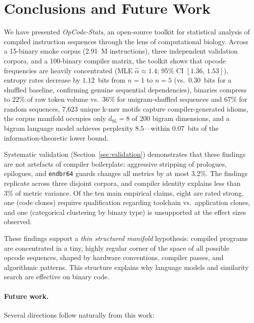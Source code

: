 \documentclass[10pt,twocolumn]{article}
\begin{document}
\section{Conclusions and Future Work}
\label{sec:conclusion}

We have presented \emph{OpCode-Stats}, an open-source toolkit for statistical
analysis of compiled instruction sequences through the lens of computational
biology.  Across a 15-binary smoke corpus (2.91~M instructions), three
independent validation corpora, and a 100-binary compiler matrix, the toolkit
shows that opcode frequencies are heavily concentrated (MLE
$\hat{\alpha} \approx 1.4$; 95\% CI $[1.36,\, 1.53]$), entropy rates
decrease by $1.12$~bits from $n\!=\!1$ to $n\!=\!5$ (vs.\ $0.30$~bits for a
shuffled baseline, confirming genuine sequential dependencies), binaries
compress to $22\%$ of raw token volume vs.\ $36\%$ for unigram-shuffled
sequences and $67\%$ for random sequences, 7,623 unique k-mer motifs capture
compiler-generated idioms, the corpus manifold occupies only $d_{95} = 8$ of
200 bigram dimensions, and a bigram language model achieves perplexity
$8.5$---within $0.07$~bits of the information-theoretic lower bound.

Systematic validation (Section~\ref{sec:validation}) demonstrates that these
findings are not artefacts of compiler boilerplate: aggressive stripping of
prologues, epilogues, and \texttt{endbr64} guards changes all metrics by at
most 3.2\%.  The findings replicate across three disjoint corpora, and
compiler identity explains less than 3\% of metric variance.  Of the ten
main empirical claims, eight are rated strong, one (code clones) requires
qualification regarding toolchain vs.\ application clones, and one
(categorical clustering by binary type) is unsupported at the effect sizes
observed.

These findings support a \emph{thin structured manifold} hypothesis:
compiled programs are concentrated in a tiny, highly regular corner of the
space of all possible opcode sequences, shaped by hardware conventions,
compiler passes, and algorithmic patterns.  This structure explains why
language models and similarity search are effective on binary code.

\paragraph{Future work.}
Several directions follow naturally from this work:
\end{document}
